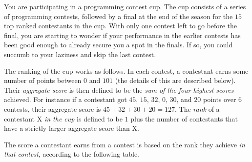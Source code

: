 
\noindent
You are participating in a programming contest cup.  The cup consists
of a series of programming contests, followed by a final at the end of
the season for the $15$ top ranked contestants in the cup.  With only
one contest left to go before the final, you are starting to wonder if
your performance in the earlier contests has been good enough to
already secure you a spot in the finals.  If so, you could succumb to
your laziness and skip the last contest.

The ranking of the cup works as follows.  In each contest, a
contestant earns some number of points between $0$ and $101$ (the
details of this are described below).  Their \emph{aggregate score} is
then defined to be the \emph{sum of the four highest scores} achieved.
For instance if a contestant got $45$, $15$, $32$, $0$, $30$, and $20$
points over $6$ contests, their aggregate score is $45+32+30+20=127$.
The \emph{rank} of a contestant X \emph{in the cup} is defined to be
$1$ plus the number of contestants that have a strictly larger
aggregate score than X.

The score a contestant earns from a contest is based on the rank they
achieve \emph{in that contest}, according to the following table.

